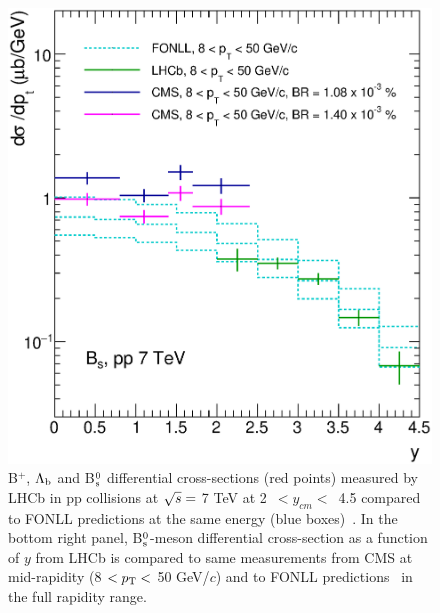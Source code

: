\begin{figure}[!htbp]
\begin{center}
\includegraphics[width=.4\textwidth]{FigCap4/FONLL_CMSVsLHC_2.eps}
\caption{B$^{+}$, $\Lambda_{\rm b}$ and B$^0_{\rm s}$ differential cross-sections (red points) measured by LHCb in pp collisions at $\sqrt{s} =$ 7 TeV at \mbox{2 $< y_{cm} <$ 4.5} compared to FONLL predictions at the same energy (blue boxes)~\cite{Aaij:2013noa,Aaij:2015fea}.
In the bottom right panel, B$^0_{\rm s}$-meson differential cross-section as a function of $y$ from LHCb is compared to same measurements from CMS at mid-rapidity (8 $< p_{\rm T} <$ 50 GeV/$c$) and to FONLL predictions~\cite{Cacciari:1998it, Cacciari:2001td} in the full rapidity range. }
\label{fig:LHCbBmesons}
\end{center}
\end{figure}
